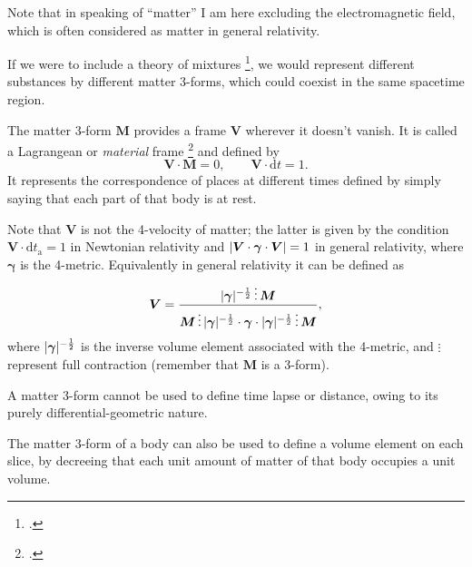\documentclass[\ifafour a4paper,12pt,\else a5paper,10pt,\fi%
onecolumn,oneside,article,%
british%
]{memoir}
\theoremstyle{remark}
\theoremstyle{innote}
\newcommand*{\citep}{\footcites}
\newcommand*{\di}{\mathrm{d}}%
\DeclarePairedDelimiter\abs{\lvert}{\rvert}
\renewcommand*{\|}[1][]{\nonscript\,#1\vert\nonscript\;\mathopen{}}
\newcommand*{\eg}{{e.g.}}
\newcommand*{\yrr}{M}
\newcommand*{\yr}{\bm{\yrr}}
\newcommand*{\ytn}{t_{\textrm{a}}}
\newcommand*{\yffg}{\gamma}
\newcommand*{\yfg}{\bm{\yffg}}
\newcommand*{\ynn}{V}
\newcommand*{\yn}{\bm{\ynn}}
\begin{document}
Note that in speaking of \enquote{matter} I am here excluding the
electromagnetic field, which is often considered as matter in general
relativity.

If we were to include a theory of mixtures
\citep[\eg][app.~5B]{truesdell1969_r1984}, we would represent different
substances by different matter 3-forms, which could coexist in the same
spacetime region.


The matter 3-form $\yr$ provides a frame $\yn$ wherever it doesn't vanish.
It is called a Lagrangean or \emph{material} frame
\citep{smarretal1978,smarretal1980} and defined by
\begin{equation}
  \label{eq:eulerian_frame_conditions}
  \yn \cdot \yr = 0, \qquad \yn \cdot \di t = 1.
\end{equation}
It represents the correspondence of places at different times defined by
simply saying that each part of that body is at rest.

Note that $\yn$ is not the 4-velocity of matter; the latter is given by the
condition $\yn\cdot \di\ytn = 1$ in Newtonian relativity and
$\abs{\yn\cdot\yfg\cdot\yn} = 1$ in general relativity, where $\yfg$ is the
4-metric. Equivalently in general relativity it can be defined as
\begin{equation}
  \label{eq:4velocity_explicit}
  \yn = \frac{\abs{\yfg}^{-\frac{1}{2}}\vdots \yr}{\yr\vdots\abs{\yfg}^{-\frac{1}{2}}\cdot\yfg\cdot\abs{\yfg}^{-\frac{1}{2}}\vdots \yr},
\end{equation}
where $\abs{\yfg}^{-\frac{1}{2}}$ is the inverse volume element associated
with the 4-metric, and $\vdots$ represent full contraction (remember that
$\yr$ is a 3-form).


A matter 3-form cannot be used to define time lapse or distance, owing to
its purely differential-geometric nature.

The matter 3-form of a body can also be used to define a volume element on
each slice, by decreeing that each unit amount of matter of that body
occupies a unit volume.
\end{document}
